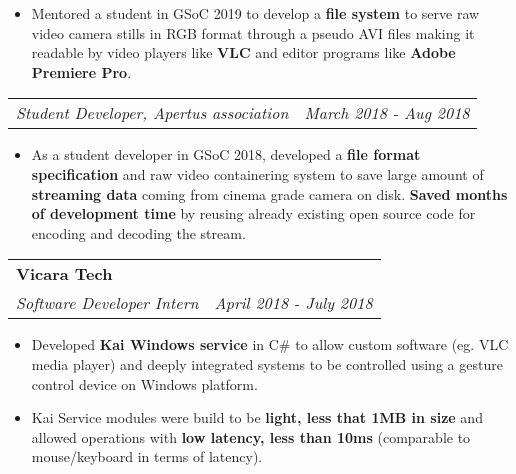 \documentclass[a4paper,6pt]{article}
\begin{document}
\small
\begin{itemize}
	\itemsep0em
    \item Mentored a student in GSoC 2019 to develop a \textcolor{mygray}{\textbf{file system}} to serve raw video camera stills in RGB format through a pseudo AVI files making it readable by video players like \textcolor{mygray}{\textbf{VLC}} and editor programs like \textcolor{mygray}{\textbf{Adobe Premiere Pro}}.
\end{itemize}

\normalsize
\vspace{2px}
\hspace{5px}
\begin{tabularx}{\textwidth}{X r}
	\textit{\small Student Developer, Apertus association}& \textit{March 2018 - Aug 2018} \\
\end{tabularx}
\small
\begin{itemize}
	\itemsep0em
	\item As a student developer in GSoC 2018, developed a \textcolor{mygray}{\textbf{file format specification}} and raw video containering system to save large amount of \textcolor{mygray}{\textbf{streaming data}} coming from cinema grade camera on disk. \textcolor{mygray}{\textbf{Saved months of development time}} by reusing already existing open source code for encoding and decoding the stream.
\end{itemize}
\normalsize

\vspace{6px}
\hspace{5px}
\begin{tabularx}{\textwidth}{X r}
	\large{\textbf{Vicara Tech}} & \\
	\textit{\small Software Developer Intern}& \textit{April 2018 - July 2018} \\
\end{tabularx}

\small
\begin{itemize}
	\itemsep0em
	\item Developed \textcolor{mygray}{\textbf{Kai Windows service}} in C\# to allow custom software (eg. VLC media player) and deeply integrated systems to be controlled using a gesture control device on Windows platform.
	\item Kai Service modules were build to be \textcolor{mygray}{\textbf{light, less that 1MB in size}} and allowed operations with \textcolor{mygray}{\textbf{low latency, less than 10ms}} (comparable to mouse/keyboard in terms of latency).
\end{itemize}
\normalsize
\end{document}
